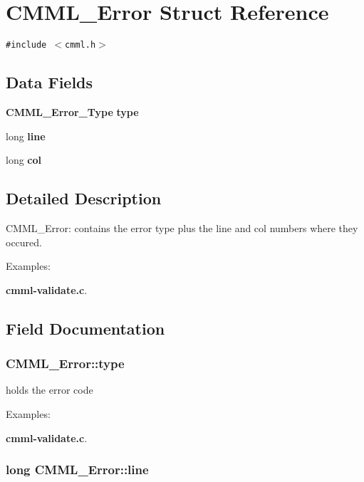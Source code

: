\section{CMML\_\-Error Struct Reference}
\label{structCMML__Error}
{\tt \#include $<$cmml.h$>$}

\subsection*{Data Fields}
\begin{CompactItemize}
\item 
{\bf CMML\_\-Error\_\-Type} {\bf type}
\item 
long {\bf line}
\item 
long {\bf col}
\end{CompactItemize}


\subsection{Detailed Description}
CMML\_\-Error: contains the error type plus the line and col numbers where they occured. \begin{Desc}
\item[Examples: ]\par


{\bf cmml-validate.c}.\end{Desc}




\subsection{Field Documentation}
\subsubsection{ {\bf CMML\_\-Error::type}}\label{structCMML__Error_o0}


holds the error code \begin{Desc}
\item[Examples: ]\par
{\bf cmml-validate.c}.\end{Desc}
\subsubsection{\setlength{\rightskip}{0pt plus 5cm}long {\bf CMML\_\-Error::line}}\label{structCMML__Error_o1}


